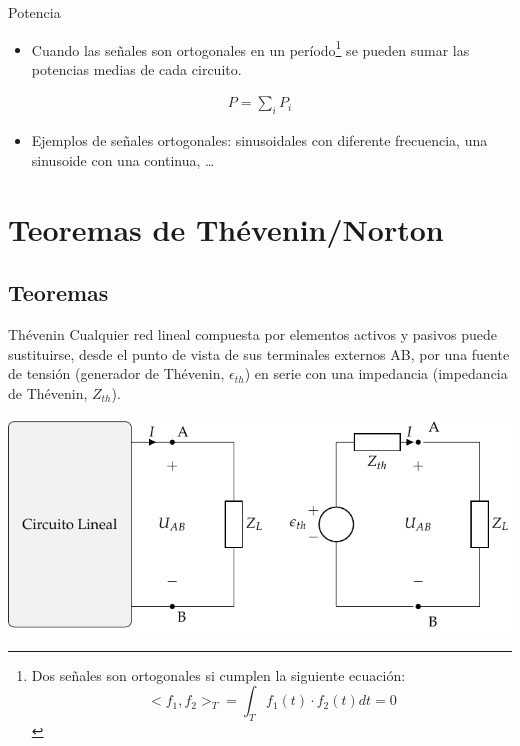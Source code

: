 \documentclass[aspectratio=169, usenames,svgnames,dvipsnames]{beamer}
\begin{document}
\begin{frame}[label={sec:orgc3c6f82}]{Potencia}
\begin{itemize}
\item Cuando las señales son \alert{ortogonales en un período}\footnote{Dos señales son ortogonales si cumplen la siguiente ecuación:
\[<f_1, f_2>_T = \int_T f_1(t) \cdot f_2(t) dt = 0\]} se pueden sumar las potencias \alert{medias} de cada circuito.
\end{itemize}
\begin{align*}
  P = \sum_i P_i
\end{align*}
\begin{itemize}
\item Ejemplos de señales ortogonales: sinusoidales con diferente frecuencia, una sinusoide con una continua, \ldots{}
\end{itemize}
\end{frame}


\section{Teoremas de Thévenin/Norton}
\label{sec:orgba3cf7a}

\subsection{Teoremas}
\label{sec:org0bfba75}

\begin{frame}[label={sec:org371aec9}]{Thévenin}
Cualquier \alert{red lineal} compuesta por elementos activos y pasivos puede sustituirse, desde el punto de vista de sus terminales externos AB, por una \alert{fuente de tensión} (generador de Thévenin, \(\epsilon_{th}\)) en \alert{serie} con una impedancia (impedancia de Thévenin, \(Z_{th}\)).

\begin{center}
\includegraphics[height=0.6\textheight]{../figs/EquivalenteThevenin.pdf}
\end{center}
\end{frame}
\end{document}
